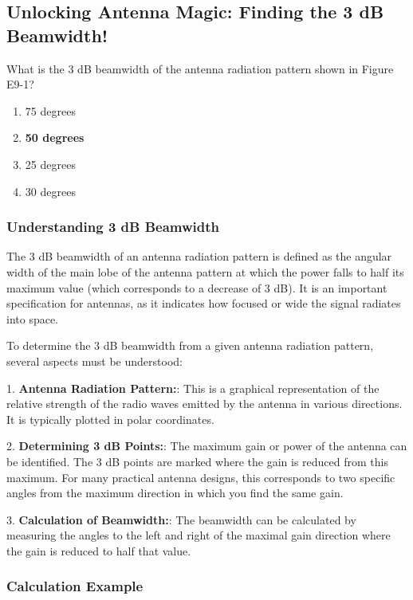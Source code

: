 \subsection{Unlocking Antenna Magic: Finding the 3 dB Beamwidth!}

\begin{tcolorbox}[colback=gray!10, colframe=black, title=E9B01] What is the 3 dB beamwidth of the antenna radiation pattern shown in Figure E9-1? 
\begin{enumerate}[label=\Alph*.]
    \item 75 degrees
    \item \textbf{50 degrees}
    \item 25 degrees
    \item 30 degrees
\end{enumerate} \end{tcolorbox}

\subsubsection{Understanding 3 dB Beamwidth}

The 3 dB beamwidth of an antenna radiation pattern is defined as the angular width of the main lobe of the antenna pattern at which the power falls to half its maximum value (which corresponds to a decrease of 3 dB). It is an important specification for antennas, as it indicates how focused or wide the signal radiates into space.

To determine the 3 dB beamwidth from a given antenna radiation pattern, several aspects must be understood: 

1. \textbf{Antenna Radiation Pattern:}: This is a graphical representation of the relative strength of the radio waves emitted by the antenna in various directions. It is typically plotted in polar coordinates.

2. \textbf{Determining 3 dB Points:}: The maximum gain or power of the antenna can be identified. The 3 dB points are marked where the gain is reduced from this maximum. For many practical antenna designs, this corresponds to two specific angles from the maximum direction in which you find the same gain.

3. \textbf{Calculation of Beamwidth:}: The beamwidth can be calculated by measuring the angles to the left and right of the maximal gain direction where the gain is reduced to half that value.

\subsubsection{Calculation Example}

